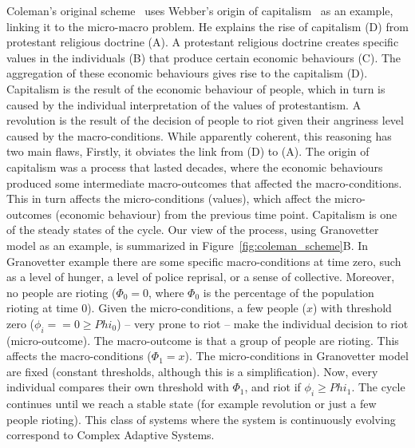 Coleman’s original scheme~\cite{coleman1990} uses Webber’s origin of capitalism~\citep{weber1904} as an example, 
linking it to the micro-macro problem. 
He explains the rise of capitalism (D) from protestant religious doctrine (A). 
A protestant religious doctrine creates specific values in the individuals (B) that produce certain economic behaviours (C). 
The aggregation of these economic behaviours gives rise to the capitalism (D). 
Capitalism is the result of the economic behaviour of people, which in turn is caused by the individual interpretation of the values of protestantism.
A revolution is the result of the decision of people to riot given their angriness level caused by the macro-conditions.
While apparently coherent, this reasoning has two main flaws, 
Firstly, it obviates the link from (D) to (A). 
The origin of capitalism was a process that lasted decades, 
where the economic behaviours produced some intermediate macro-outcomes that affected the macro-conditions. 
This in turn affects the micro-conditions (values), 
which affect the micro-outcomes (economic behaviour) from the previous time point. 
Capitalism is one of the steady states of the cycle.
Our view of the process, using Granovetter model as an example, is summarized in Figure~\ref{fig:coleman_scheme}B. 
In Granovetter example there are some specific macro-conditions at time zero, 
such as a level of hunger, a level of police reprisal, or a sense of collective.
Moreover, no people are rioting ($\Phi_0 = 0$, where $\Phi_0$ is the percentage of the population rioting at time 0). 
Given the micro-conditions, a few people ($x$) with threshold zero ($\phi_i == 0 \geq Phi_0$) -- very prone to riot -- make the individual decision to riot (micro-outcome). 
The macro-outcome is that a group of people are rioting. 
This affects the macro-conditions ($\Phi_1 = x$). 
The micro-conditions in Granovetter model are fixed (constant thresholds, although this is a simplification).
Now, every individual compares their own threshold with $\Phi_1$, and riot if $\phi_i \geq Phi_1$. 
The cycle continues until we reach a stable state (for example revolution or just a few people rioting).
This class of systems where the system is continuously evolving correspond to Complex Adaptive Systems.


